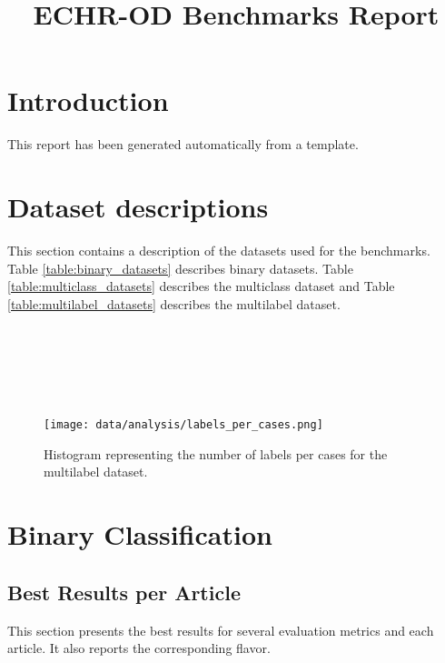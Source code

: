 \documentclass{article}
\begin{document}
\title{ECHR-OD Benchmarks Report}


\maketitle

\tableofcontents


\section*{Introduction}

This report has been generated automatically from a template.

\section{Dataset descriptions}

This section contains a description of the datasets used for the benchmarks.
Table \ref{table:binary_datasets} describes binary datasets. Table \ref{table:multiclass_datasets} describes the multiclass dataset and Table \ref{table:multilabel_datasets} describes the multilabel dataset.

~\\
\newpage

~\\
\newpage

~\\
\newpage



\begin{figure}
    \centering
    \texttt{[image: data/analysis/labels\_per\_cases.png]}
    \caption{Histogram representing the number of labels per cases for the multilabel dataset.}
\end{figure}



\section{Binary Classification}
\subsection{Best Results per Article}

This section presents the best results for several evaluation metrics and each article. It also reports the corresponding flavor.
\end{document}

